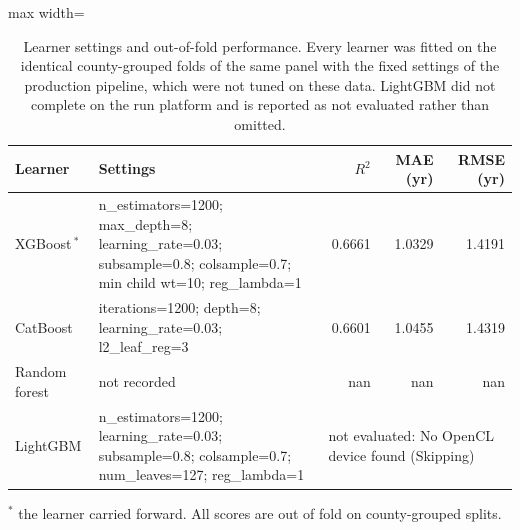\begin{table}[H]
\caption{Learner settings and out-of-fold performance. Every learner was fitted on the identical county-grouped folds of the same panel with the fixed settings of the production pipeline, which were not tuned on these data. LightGBM did not complete on the run platform and is reported as not evaluated rather than omitted.}
\label{tab:learners}
\begin{adjustbox}{max width=\textwidth}
\begin{tabular}{llrrr}
\toprule
Learner & Settings & $R^{2}$ & MAE (yr) & RMSE (yr) \\
\midrule
XGBoost\,$^{\ast}$ & n\_estimators=1200; max\_depth=8; learning\_rate=0.03; subsample=0.8; colsample=0.7; min child wt=10; reg\_lambda=1 & 0.6661 & 1.0329 & 1.4191 \\
CatBoost & iterations=1200; depth=8; learning\_rate=0.03; l2\_leaf\_reg=3 & 0.6601 & 1.0455 & 1.4319 \\
Random forest & not recorded & nan & nan & nan \\
LightGBM & n\_estimators=1200; learning\_rate=0.03; subsample=0.8; colsample=0.7; num\_leaves=127; reg\_lambda=1 & \multicolumn{3}{l}{not evaluated: No OpenCL device found (Skipping)} \\
\bottomrule
\end{tabular}
\end{adjustbox}
\vspace{2pt}
\footnotesize $^{\ast}$ the learner carried forward. All scores are out of fold on county-grouped splits.
\end{table}
